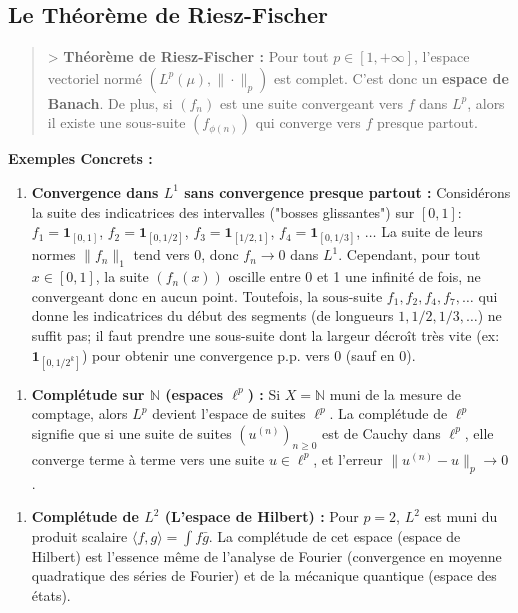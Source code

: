 \documentclass[11pt,a4paper]{article}
\begin{document}
\subsection{Le Théorème de Riesz-Fischer}
\begin{quote}
> \textbf{Théorème de Riesz-Fischer :}
Pour tout $p \in [1, +\infty]$, l'espace vectoriel normé $(L^p(\mu), \|\cdot\|_p)$ est complet. C'est donc un \textbf{espace de Banach}. De plus, si $(f_n)$ est une suite convergeant vers $f$ dans $L^p$, alors il existe une sous-suite $(f_{\phi(n)})$ qui converge vers $f$ presque partout.

\end{quote}
\textbf{Exemples Concrets :}
\begin{enumerate}
\item \textbf{Convergence dans $L^1$ sans convergence presque partout :} Considérons la suite des indicatrices des intervalles ("bosses glissantes") sur $[0,1]$:
   $f_1 = \mathbf{1}_{[0,1]}$, $f_2 = \mathbf{1}_{[0,1/2]}$, $f_3 = \mathbf{1}_{[1/2,1]}$, $f_4 = \mathbf{1}_{[0,1/3]}$, $\dots$
   La suite de leurs normes $\|f_n\|_1$ tend vers $0$, donc $f_n \to 0$ dans $L^1$. Cependant, pour tout $x \in [0,1]$, la suite $(f_n(x))$ oscille entre 0 et 1 une infinité de fois, ne convergeant donc en aucun point. Toutefois, la sous-suite $f_1, f_2, f_4, f_7, \dots$ qui donne les indicatrices du début des segments (de longueurs $1, 1/2, 1/3, \dots$) ne suffit pas; il faut prendre une sous-suite dont la largeur décroît très vite (ex: $\mathbf{1}_{[0, 1/2^k]}$) pour obtenir une convergence p.p. vers $0$ (sauf en $0$).
\end{enumerate}

\begin{enumerate}
\item \textbf{Complétude sur $\mathbb{N}$ (espaces $\ell^p$) :} Si $X = \mathbb{N}$ muni de la mesure de comptage, alors $L^p$ devient l'espace de suites $\ell^p$. La complétude de $\ell^p$ signifie que si une suite de suites $(u^{(n)})_{n \ge 0}$ est de Cauchy dans $\ell^p$, elle converge terme à terme vers une suite $u \in \ell^p$, et l'erreur $\|u^{(n)} - u\|_p \to 0$.
\end{enumerate}

\begin{enumerate}
\item \textbf{Complétude de $L^2$ (L'espace de Hilbert) :} Pour $p=2$, $L^2$ est muni du produit scalaire $\langle f, g \rangle = \int f \bar{g}$. La complétude de cet espace (espace de Hilbert) est l'essence même de l'analyse de Fourier (convergence en moyenne quadratique des séries de Fourier) et de la mécanique quantique (espace des états).
\end{enumerate}
\end{document}
